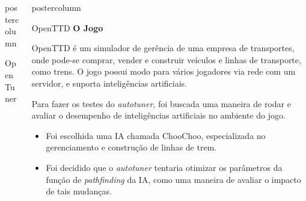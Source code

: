 \documentclass[final]{beamer}
\newlength{\columnheight}
\begin{document}
\begin{frame}
\begin{columns}
\begin{column}{.5\textwidth}
\begin{beamercolorbox}[center,wd=\textwidth]{postercolumn}
\begin{minipage}[T]{.95\textwidth}
{\begin{block}{OpenTuner}
                \vspace*{0.2cm} 
            \end{block}
                        
            \vspace*{0.2cm}
          }
        \end{minipage}
      \end{beamercolorbox}
    \end{column}

    \begin{column}{.5\textwidth}
      \begin{beamercolorbox}[center,wd=\textwidth]{postercolumn}
        \begin{minipage}[T]{.95\textwidth} %
          \parbox[t][\columnheight]{\textwidth}{ %
            
            \vspace*{0.8cm}
            
            \begin{block}{OpenTTD}
                \textbf{O Jogo}
                
                  OpenTTD é um simulador de gerência de uma empresa de transportes, onde pode-se comprar, vender e construir veículos e linhas de transporte, como trens. O jogo possui modo para vários jogadores via rede com um servidor, e suporta inteligências artificiais.
                
                \vspace*{0.2cm}
                Para fazer os testes do \textit{autotuner}, foi buscada uma maneira de rodar e avaliar o desempenho de inteligências artificiais no ambiente do jogo.
                \begin{itemize}
                  \item Foi escolhida uma IA chamada ChooChoo, especializada no gerenciamento e construção de linhas de trem.
                  \item Foi decidido que o \textit{autotuner} tentaria otimizar os parâmetros da função de \textit{pathfinding} da IA, como uma maneira de avaliar o impacto de tais mudanças.
                \end{itemize}  
                         

\end{block}}
\end{minipage}
\end{beamercolorbox}
\end{column}
\end{columns}
\end{frame}
\end{document}
